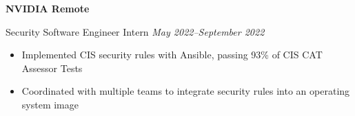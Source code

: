 \textbf{NVIDIA \hfill Remote}\par

Security Software Engineer Intern \hfill \textit{May 2022--September 2022}
\begin{itemize}
	\item Implemented CIS security rules with Ansible, passing 93\% of CIS CAT Assessor Tests
	\item Coordinated with multiple teams to integrate security rules into an operating system image
\end{itemize}\par
